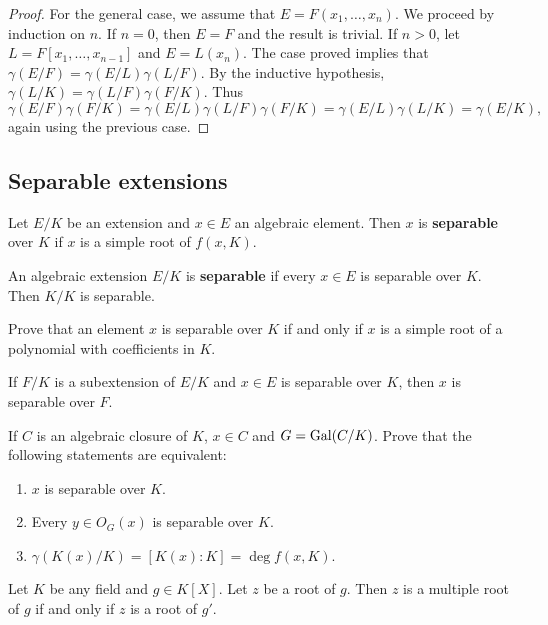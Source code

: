 \begin{proof}
    \medskip 
    For the general case, we assume that $E=F(x_1,\dots,x_n)$. We proceed
    by induction on $n$. If $n=0$, then $E=F$ and the result is trivial. 
    If $n>0$, let $L=F[x_1,\dots,x_{n-1}]$ and $E=L(x_n)$. The 
    case proved 
    implies that $\gamma(E/F)=\gamma(E/L)\gamma(L/F)$. By the inductive 
    hypothesis, $\gamma(L/K)=\gamma(L/F)\gamma(F/K)$. Thus 
    \[
    \gamma(E/F)\gamma(F/K)=\gamma(E/L)\gamma(L/F)\gamma(F/K)
    =\gamma(E/L)\gamma(L/K)=\gamma(E/K),
    \]
    again using the previous case. 
\end{proof}

\subsection{Separable extensions}

\begin{definition}
    Let $E/K$ be an extension and $x\in E$ an algebraic element. Then
    $x$ is \textbf{separable} over $K$ if $x$ is a simple root
    of $f(x,K)$. 
\end{definition}

An algebraic extension $E/K$ is \textbf{separable} 
if every $x\in E$ is separable over $K$. Then $K/K$ is separable. 

\begin{exercise}
    Prove that 
    an element $x$ is separable over $K$ if and only if $x$ is a simple root
    of a polynomial with coefficients in $K$. 
\end{exercise}

If $F/K$ is a subextension of $E/K$ and $x\in E$ is separable over $K$, then
$x$ is separable over $F$. 

\begin{exercise}
    If $C$ is an algebraic closure of $K$, $x\in C$ and $G=\operatorname{Gal}(C/K)$. 
    Prove that the following statements are equivalent:
    \begin{enumerate}
        \item $x$ is separable over $K$.
        \item Every $y\in O_G(x)$ is separable over $K$.
        \item $\gamma(K(x)/K)=[K(x):K]=\deg f(x,K)$. 
    \end{enumerate}
\end{exercise}

Let $K$ be any field and $g\in K[X]$. Let $z$ be a root of $g$. 
Then $z$ is a multiple root of $g$ if and only if $z$ is a root of $g'$. 

